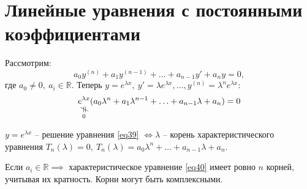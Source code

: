 

\section{Линейные уравнения с постоянными коэффициентами}

\begin{note}
    Рассмотрим:
    \begin{equation}\label{eq39}
        a_0y^{(n)} + a_1y^{(n-1)} + \ldots + a_{n-1}y' + a_ny = 0,
    \end{equation}
    где $a_0 \ne 0, \ a_i \in \mathbb{R}$. Теперь $y = e^{\lambda x}, \ y' = \lambda e^{\lambda x}, \ldots, y^{(n)} = \lambda^n e^{\lambda x}$:
    \begin{equation}\label{eq40}
        \nequalto{e^{\lambda x}}{0}(a_0\lambda^n + a_1\lambda^{n-1} + \ldots + a_{n-1}\lambda + a_n) = 0
    \end{equation}

    $y = e^{\lambda x}$ -- решение уравнения \ref{eq39} $\iff \lambda$ -- корень характеристического уравнения $T_n(\lambda) = 0, \ T_n(\lambda) = a_0\lambda^n + \ldots + a_{n-1}\lambda + a_n$.

    Если $a_i \in \mathbb{R} \implies$ характеристическое уравнение \ref{eq40} имеет ровно $n$ корней, учитывая их кратность. Корни могут быть комплексными.


\end{note}
